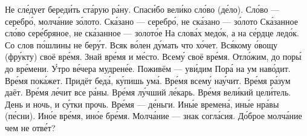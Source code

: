 \documentclass[a4paper]{article}
\begin{document}
              {Не сле́дует береди́ть ста́рую ра́ну.}
         {Спаси́бо вели́ко сло́во (де́ло).}
          {Сло́во --- серебро́, молча́ние зо́лото.
        \mitem Ска́зано --- серебро́, не ска́зано --- зо́лото
        \mitem Ска́занное сло́во сере́бряное, не ска́занное --- золото́е}
         {На слова́х медо́к, а на се́рдце ледо́к.}
    {Со слов по́шлины не беру́т.
        \mitem Всяк во́лен ду́мать что хо́чет.}
               {Вся́кому о́вощу (фру́кту) своё вре́мя.
        \mitem Знай вре́мя и ме́сто.
        }
               {Всему́ своё вре́мя.}
              {Отло́жим, до поры́ до вре́мени.}
       {У́тро ве́чера мудрене́е.
       \mitem Поживём --- уви́дим
       \mitem Пора́ на ум наво́дит.
        \mitem Вре́мя пока́жет.
        \mitem Придёт беда́, ку́пишь ума́.
        \mitem Вре́мя всему́ нау́чит.
        \mitem Вре́мя ра́зум даёт.}
        {Вре́мя ле́чит все ра́ны.
        \mitem Вре́мя лу́чший ле́карь.
        \mitem Вре́мя вели́кий цели́тель.}
     {День и ночь, и су́тки прочь.}
         {Вре́мя --- де́ньги.}
        {Ины́е времена́, ины́е нра́вы (пе́сни).
        \mitem Ино́е вре́мя, ино́е бре́мя.}
              {Молча́ние --- знак согла́сия.
        \mitem До́брое молча́ние чем не отве́т?}
\end{document}
